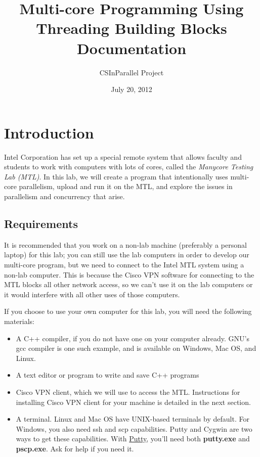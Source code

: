 \documentclass[letterpaper,10pt,openany,oneside]{sphinxmanual}
\title{Multi-core Programming Using Threading Building Blocks Documentation}
\date{July 20, 2012}
\author{CSInParallel Project}
\begin{document}
\maketitle
\tableofcontents
{}\label{index::doc}



\chapter{Introduction}
\label{Introduction/Introduction:introduction}\label{Introduction/Introduction::doc}\label{Introduction/Introduction:multi-core-programming-using-threading-building-blocks}
Intel Corporation has set up a special remote system that allows faculty and students to work with computers with lots of cores, called the \emph{Manycore Testing Lab (MTL)}. In this lab, we will create a program that intentionally uses multi-core parallelism, upload and run it on the MTL, and explore the issues in parallelism and concurrency that arise.


\section{Requirements}
\label{Introduction/Introduction:requirements}
It is recommended that you work on a non-lab machine (preferably a personal laptop) for this lab; you can still use the lab computers in order to develop our multi-core program, but we need to connect to the Intel MTL system using a non-lab computer. This is because the Cisco VPN software for connecting to the MTL blocks all other network access, so we can't use it on the lab computers or it would interfere with all other uses of those computers.

If you choose to use your own computer for this lab, you will need the following materials:
\begin{itemize}
\item {} 
A C++ compiler, if you do not have one on your computer already.  GNU's gcc compiler is one such example, and is available on Windows, Mac OS, and Linux.

\item {} 
A text editor or program to write and save C++ programs

\item {} 
Cisco VPN client, which we will use to access the MTL. Instructions for installing Cisco VPN client for your machine is detailed in the next section.

\item {} 
A terminal. Linux and Mac OS have UNIX-based terminals by default. For Windows, you also need ssh and scp capabilities. Putty and Cygwin are two ways to get these capabilities. With \href{http://www.chiark.greenend.org.uk/~sgtatham/putty/download.html}{Putty}, you'll need both \textbf{putty.exe} and \textbf{pscp.exe}. Ask for help if you need it.

\end{itemize}
\end{document}

